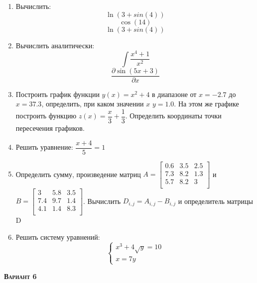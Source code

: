 \begin{enumerate}
\item Вычислить: 
\begin{equation*}\ln(3+sin(4))                     \end{equation*}
\begin{equation*}\cos(14)                          \end{equation*}
\begin{equation*}\ln(3+sin(4))                     \end{equation*}

\item Вычислить аналитически: 
 \begin{equation*} \int \dfrac{x^4+1}{x^2} \end{equation*}\begin{equation*} {\dfrac{\partial \sin(5 x +3)}{\partial x}} \end{equation*}
\item Построить график функции $y(x)=x^2+4            $ в диапазоне от $x=-2.7$ до $x=37.3$, определить, при каком значении $x$ $y=1.0$. На этом же графике построить функцию $z(x)=\dfrac{x}{3}+\dfrac{1}{3} $. Определить координаты точки пересечения графиков. \item Решить уравнение: $\dfrac{x+4}{5}=1     $

\item Определить сумму, произведение матриц $A=\begin{bmatrix}
0.6 &3.5 &2.5 \\
7.3 &8.2 &1.3 \\
5.7 &8.2 &3 \\
\end{bmatrix}
$ и $B=\begin{bmatrix}
3 &5.8 &3.5 \\
7.4 &9.7 &1.4 \\
4.1 &1.4 &8.3 \\
\end{bmatrix}
$. Вычислить $D_{i,j}=A_{i,j}  -  B_{i,j}$ и определитель матрицы D

\item Решить систему уравнений: \begin{equation*} \begin{cases} x^3+4 \sqrt{y}=10    \\ x=7y                  \end{cases} \end{equation*} 

\end{enumerate}
\textsc{\textbf{Вариант 6}}

